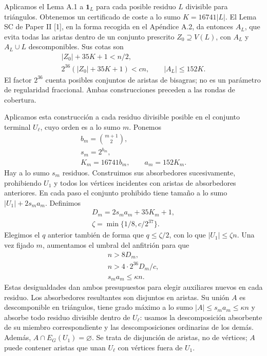\documentclass[spanish,11pt,a4paper]{article}
\begin{document}
Aplicamos el Lema A.1 a \(\mathbf1_L\) para cada posible residuo \(L\) divisible para triángulos. Obtenemos un certificado de coste a lo sumo \(K=16741|L|\). El Lema SC de Paper II {[}1{]}, en la forma recogida en el Apéndice A.2, da entonces \(A_L\), que evita todas las aristas dentro de un conjunto prescrito \(Z_0\supseteq V(L)\), con \(A_L\) y \(A_L\cup L\) descomponibles. Sus cotas son \[\begin{gathered}
|Z_0|+35K+1<n/2,\\
2^{36}(|Z_0|+35K+1)<cn,\qquad |A_L|\le152K.
\end{gathered}\] El factor \(2^{36}\) cuenta posibles conjuntos de aristas de bisagras; no es un parámetro de regularidad fraccional. Ambas construcciones preceden a las rondas de cobertura.

Aplicamos esta construcción a cada residuo divisible posible en el conjunto terminal \(U_\ell\), cuyo orden es a lo sumo \(m\). Ponemos \[\begin{gathered}
b_m=\binom{m+1}{2},\\
s_m=2^{b_m},\\
K_m=16741b_m,\qquad a_m=152K_m.
\end{gathered}\] Hay a lo sumo \(s_m\) residuos. Construimos sus absorbedores sucesivamente, prohibiendo \(U_1\) y todos los vértices incidentes con aristas de absorbedores anteriores. En cada paso el conjunto prohibido tiene tamaño a lo sumo \(|U_1|+2s_ma_m\). Definimos \[\begin{gathered}
D_m=2s_ma_m+35K_m+1,\\
\zeta=\min\{1/8,c/2^{37}\}.
\end{gathered}\] Elegimos el \(q\) anterior también de forma que \(q\le\zeta/2\), con lo que \(|U_1|\le\zeta n\). Una vez fijado \(m\), aumentamos el umbral del anfitrión para que \[\begin{gathered}
n>8D_m,\\
n>4\cdot2^{36}D_m/c,\\
s_ma_m\le\kappa n.
\end{gathered}\] Estas desigualdades dan ambos presupuestos para elegir auxiliares nuevos en cada residuo. Los absorbedores resultantes son disjuntos en aristas. Su unión \(A\) es descomponible en triángulos, tiene grado máximo a lo sumo \(|A|\le s_ma_m\le\kappa n\) y absorbe todo residuo divisible dentro de \(U_\ell\): usamos la descomposición absorbente de su miembro correspondiente y las descomposiciones ordinarias de los demás. Además, \(A\cap E_G(U_1)=\varnothing\). Se trata de disjunción de aristas, no de vértices; \(A\) puede contener aristas que unan \(U_\ell\) con vértices fuera de \(U_1\).
\end{document}
